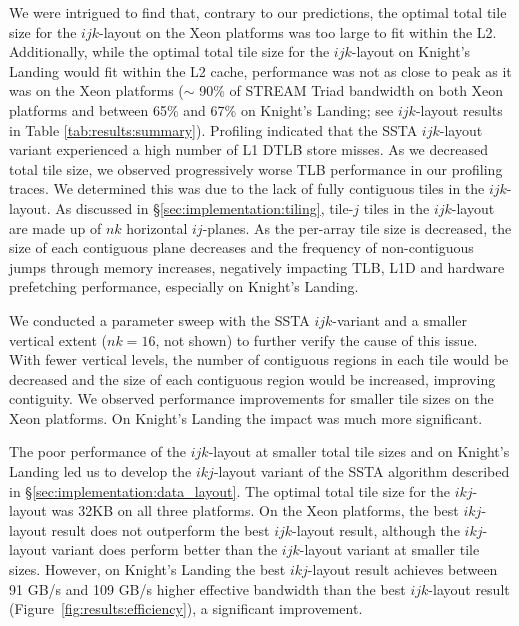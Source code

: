 \documentclass{sig-alternate-05-2015}
\begin{document}
We were intrigued to find that, contrary to our predictions, the optimal total
  tile size for the \(ijk\)-layout on the Xeon platforms was too large to fit
  within the L2.
Additionally, while the optimal total tile size for the \(ijk\)-layout on
  Knight's Landing would fit within the L2 cache, performance was not as close to
  peak as it was on the Xeon platforms (\(\sim\) 90\% of STREAM Triad bandwidth
  on both Xeon platforms and between 65\% and 67\% on Knight's Landing; see
  \(ijk\)-layout results in Table \ref{tab:results:summary}).
Profiling indicated that the SSTA \(ijk\)-layout variant experienced a high
  number of L1 DTLB store misses.
As we decreased total tile size, we observed progressively worse TLB performance
  in our profiling traces.
We determined this was due to the lack of fully contiguous tiles in the
  \(ijk\)-layout. 
As discussed in \S\ref{sec:implementation:tiling}, tile-\(j\) tiles in the
  \(ijk\)-layout are made up of \(nk\) horizontal \(ij\)-planes. 
As the per-array tile size is decreased, the size of each contiguous
  plane decreases and the frequency of non-contiguous jumps through memory
  increases, negatively impacting TLB, L1D and hardware prefetching performance,
  especially on Knight's Landing.

We conducted a parameter sweep with the SSTA \(ijk\)-variant and a smaller
  vertical extent (\(nk = 16\), not shown) to further verify the cause of this
  issue.
With fewer vertical levels, the number of contiguous regions in each tile would
  be decreased and the size of each contiguous region would be increased, improving
  contiguity.
We observed performance improvements for smaller tile sizes on the Xeon
  platforms.
On Knight's Landing the impact was much more significant.

The poor performance of the \(ijk\)-layout at smaller total tile sizes and on
  Knight's Landing led us to develop the \(ikj\)-layout variant of the SSTA
  algorithm described in \S\ref{sec:implementation:data_layout}.
The optimal total tile size for the \(ikj\)-layout was 32KB on all three
  platforms.
On the Xeon platforms, the best \(ikj\)-layout result does not outperform the
  best \(ijk\)-layout result, although the \(ikj\)-layout variant does perform
  better than the \(ijk\)-layout variant at smaller tile sizes.
However, on Knight's Landing the best \(ikj\)-layout result achieves
  between 91 GB/s and 109 GB/s higher effective bandwidth than the best
  \(ijk\)-layout result (Figure~\ref{fig:results:efficiency}), a significant
  improvement.
\end{document}
